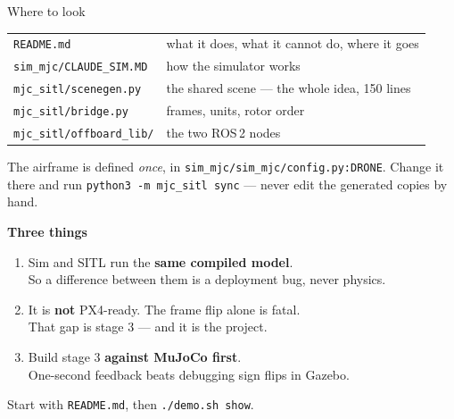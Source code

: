 \documentclass[aspectratio=169,11pt]{beamer}
\newcommand{\file}[1]{\texttt{\small #1}}
\begin{document}
\begin{frame}[fragile]{Where to look}
  \begin{center}
  \begin{tabular}{@{}ll@{}}
    \toprule
    \file{README.md} & what it does, what it cannot do, where it goes\\
    \file{sim\_mjc/CLAUDE\_SIM.MD} & how the simulator works\\
    \midrule
    \file{mjc\_sitl/scenegen.py} & the shared scene --- the whole idea, 150 lines\\
    \file{mjc\_sitl/bridge.py} & frames, units, rotor order\\
    \file{mjc\_sitl/offboard\_lib/} & the two ROS\,2 nodes\\
    \bottomrule
  \end{tabular}
  \end{center}

  \vspace{0.7cm}
  {\small The airframe is defined \emph{once}, in
  \file{sim\_mjc/sim\_mjc/config.py:DRONE}. Change it there and run
  \texttt{python3 -m mjc\_sitl sync} --- never edit the generated copies by
  hand.}
\end{frame}

{
\begin{frame}
  \vspace{1.0cm}
  \begin{center}{\Large\bfseries Three things}\end{center}
  \vspace{0.7cm}
  \begin{enumerate}
    \setlength{\itemsep}{0.45cm}
    \item {\large Sim and SITL run the \textbf{same compiled model}.}\\
      {\small So a difference between them is a deployment bug, never physics.}
    \item {\large It is \textbf{not} PX4-ready. The frame flip alone is fatal.}\\
      {\small That gap is stage 3 --- and it is the project.}
    \item {\large Build stage 3 \textbf{against MuJoCo first}.}\\
      {\small One-second feedback beats debugging sign flips in Gazebo.}
  \end{enumerate}
  \vspace{0.8cm}
  \begin{center}{\color{dimc} Start with \file{README.md}, then \texttt{./demo.sh show}.}\end{center}
\end{frame}}
\end{document}
